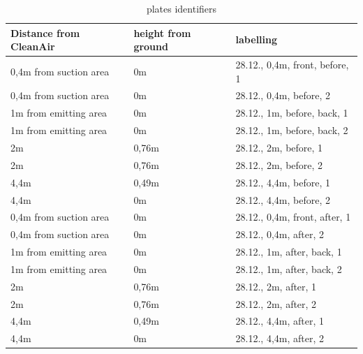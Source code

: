 \documentclass[hyperref]{labbook}
\begin{document}
\begin{table}[H]
\begin{tabular}{|lll|}\hline
Distance from CleanAir  & height from ground & labelling\\\hline
0,4m from suction area & 0m & 28.12., 0,4m, front, before, 1 \\
0,4m from suction area & 0m & 28.12., 0,4m, before, 2 \\
1m from emitting area & 0m & 28.12., 1m, before, back, 1\\
1m from emitting area & 0m & 28.12., 1m, before, back, 2\\
2m & 0,76m & 28.12., 2m, before, 1\\
2m & 0,76m & 28.12., 2m, before, 2\\
4,4m & 0,49m & 28.12., 4,4m, before, 1\\
4,4m & 0m & 28.12., 4,4m, before, 2\\\hline
0,4m from suction area & 0m & 28.12., 0,4m, front, after, 1 \\
0,4m from suction area & 0m & 28.12., 0,4m, after, 2 \\
1m from emitting area & 0m & 28.12., 1m, after, back, 1\\
1m from emitting area & 0m & 28.12., 1m, after, back, 2\\
2m & 0,76m & 28.12., 2m, after, 1\\
2m & 0,76m & 28.12., 2m, after, 2\\
4,4m & 0,49m & 28.12., 4,4m, after, 1\\
4,4m & 0m & 28.12., 4,4m, after, 2\\\hline
\end{tabular}
\caption{plates identifiers}
\end{table}

\end{document}
